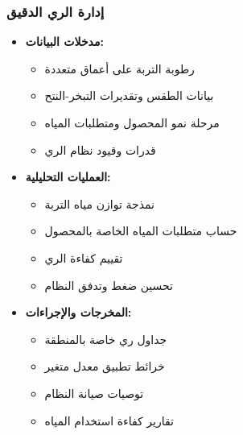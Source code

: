 \subsubsection{إدارة الري الدقيق}
\begin{itemize}
    \item \textbf{مدخلات البيانات:}
    \begin{itemize}
        \item رطوبة التربة على أعماق متعددة
        \item بيانات الطقس وتقديرات التبخر-النتح
        \item مرحلة نمو المحصول ومتطلبات المياه
        \item قدرات وقيود نظام الري
    \end{itemize}
    
    \item \textbf{العمليات التحليلية:}
    \begin{itemize}
        \item نمذجة توازن مياه التربة
        \item حساب متطلبات المياه الخاصة بالمحصول
        \item تقييم كفاءة الري
        \item تحسين ضغط وتدفق النظام
    \end{itemize}
    
    \item \textbf{المخرجات والإجراءات:}
    \begin{itemize}
        \item جداول ري خاصة بالمنطقة
        \item خرائط تطبيق معدل متغير
        \item توصيات صيانة النظام
        \item تقارير كفاءة استخدام المياه
    \end{itemize}
\end{itemize}

